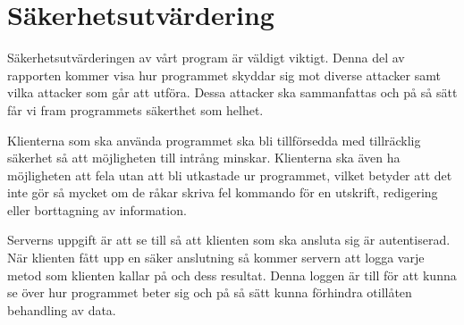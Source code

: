 \section{Säkerhetsutvärdering}
Säkerhetsutvärderingen av vårt program är väldigt viktigt. Denna del av rapporten kommer visa hur programmet skyddar sig mot diverse attacker samt vilka attacker som går att utföra. Dessa attacker ska sammanfattas och på så sätt får vi fram programmets säkerthet som helhet. 

Klienterna som ska använda programmet ska bli tillförsedda med tillräcklig säkerhet så att möjligheten till intrång minskar. Klienterna ska även ha möjligheten att fela utan att bli utkastade ur programmet, vilket betyder att det inte gör så mycket om de råkar skriva fel kommando för en utskrift, redigering eller borttagning av information.

Serverns uppgift är att se till så att klienten som ska ansluta sig är autentiserad. När klienten fått upp en säker anslutning så kommer servern att logga varje metod som klienten kallar på och dess resultat. Denna loggen är till för att kunna se över hur programmet beter sig och på så sätt kunna förhindra otillåten behandling av data.